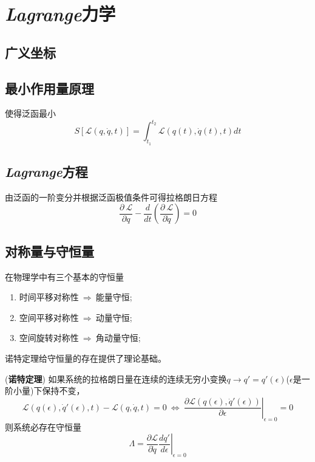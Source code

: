 \chapter{\textsl{Lagrange}力学}

\section{广义坐标}

\section{最小作用量原理}

使得泛函最小
\begin{equation}
    S[\mathcal{L}(q,\dot{q},t)]=\int_{t_1}^{t_2} \mathcal{L}(q(t),\dot{q}(t),t) dt
\end{equation}

\section{\textsl{Lagrange}方程}

由泛函的一阶变分并根据泛函极值条件可得拉格朗日方程
\begin{equation}
    \frac{\partial\ \mathcal{L}}{\partial q}-\frac{d}{dt}(\frac{\partial\ \mathcal{L}}{\partial \dot{q}})=0
\end{equation}

\section{对称量与守恒量}

在物理学中有三个基本的守恒量

\begin{enumerate}[itemindent=2em]
    \item 时间平移对称性$\ \Rightarrow\ $能量守恒;
    \item 空间平移对称性$\ \Rightarrow\ $动量守恒;
    \item 空间旋转对称性$\ \Rightarrow\ $角动量守恒;
\end{enumerate}

诺特定理给守恒量的存在提供了理论基础。

\begin{framed}
    \begin{theorem}
        (\textbf{诺特定理}) 如果系统的拉格朗日量在连续的连续无穷小变换$q\rightarrow q'=q'(\epsilon)$($\epsilon$是一阶小量)下保持不变，
        \begin{equation}
            \mathcal{L}(q(\epsilon),\dot{q}'(\epsilon),t)-\mathcal{L}(q,\dot{q},t)=0\ \Leftrightarrow\ \left.\frac{\partial \mathcal{L}(q(\epsilon),\dot{q}'(\epsilon))}{\partial \epsilon}\right|_{\epsilon=0}=0
        \end{equation}
        则系统必存在守恒量
        \begin{equation}
            \varLambda=\frac{\partial \mathcal{L}}{\partial \dot{q}}\left.\frac{d q'}{d \epsilon}\right|_{\epsilon=0}
        \end{equation}
    \end{theorem}
\end{framed}

